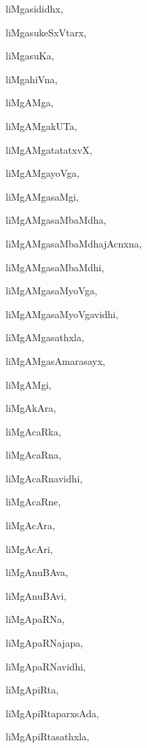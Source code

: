 \begin{multicols}{2}
{liMgasididhx}, \pageref{liMgasididhx}

{liMgasukeSxVtarx}, \pageref{liMgasukeSxVtarx}

{liMgasuKa}, \pageref{liMgasuKa}

{liMgahiVna}, \pageref{liMgahiVna}

{liMgAMga}, \pageref{liMgAMga}

{liMgAMgakUTa}, \pageref{liMgAMgakUTa}

{liMgAMgatatatxvX}, \pageref{liMgAMgatatatxvX}

{liMgAMgayoVga}, \pageref{liMgAMgayoVga}

{liMgAMgasaMgi}, \pageref{liMgAMgasaMgi}

{liMgAMgasaMbaMdha}, \pageref{liMgAMgasaMbaMdha}

{liMgAMgasaMbaMdhajAcnxna}, \pageref{liMgAMgasaMbaMdhajAcnxna}

{liMgAMgasaMbaMdhi}, \pageref{liMgAMgasaMbaMdhi}

{liMgAMgasaMyoVga}, \pageref{liMgAMgasaMyoVga}

{liMgAMgasaMyoVgavidhi}, \pageref{liMgAMgasaMyoVgavidhi}

{liMgAMgasathxla}, \pageref{liMgAMgasathxla}

{liMgAMgasAmarasayx}, \pageref{liMgAMgasAmarasayx}

{liMgAMgi}, \pageref{liMgAMgi}

{liMgAkAra}, \pageref{liMgAkAra}

{liMgAcaRka}, \pageref{liMgAcaRka}

{liMgAcaRna}, \pageref{liMgAcaRna}

{liMgAcaRnavidhi}, \pageref{liMgAcaRnavidhi}

{liMgAcaRne}, \pageref{liMgAcaRne}

{liMgAcAra}, \pageref{liMgAcAra}

{liMgAcAri}, \pageref{liMgAcAri}

{liMgAnuBAva}, \pageref{liMgAnuBAva}

{liMgAnuBAvi}, \pageref{liMgAnuBAvi}

{liMgApaRNa}, \pageref{liMgApaRNa}

{liMgApaRNajapa}, \pageref{liMgApaRNajapa}

{liMgApaRNavidhi}, \pageref{liMgApaRNavidhi}

{liMgApiRta}, \pageref{liMgApiRta}

{liMgApiRtaparxsAda}, \pageref{liMgApiRtaparxsAda}

{liMgApiRtasathxla}, \pageref{liMgApiRtasathxla}


\end{multicols}
